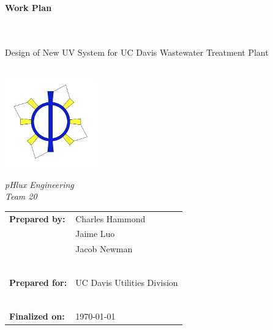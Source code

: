 \documentclass[11pt,letterpaper,final]{report}
\author{Charles Hammond \\ Jaime Luo \\ Jacob Newman}
\begin{document}
\begin{center}

\begin{huge} 

\begin{Huge}\textbf{Work Plan} \end{Huge} \\~\\  Design of New UV System for UC Davis Wastewater Treatment Plant \\~\\
\end{huge}






\begin{large}

\vspace{100pt}
\includegraphics[height=1.5in]{wp1}\\
\end{large}
\begin{Large} \textit{pHlux Engineering} \\ \textit{Team 20} \end{Large}
\vspace{100pt}


\begin{tabular}{ll}
    \textbf{Prepared by:}&Charles Hammond\\
                         & Jaime Luo\\
                         & Jacob Newman\\
                         & \\~\\
    \textbf{Prepared for:}& UC Davis Utilities Division \\
                         & \\~\\
    \textbf{Finalized on:}& \today\\ 

\end{tabular}

\end{center}
\end{document}
